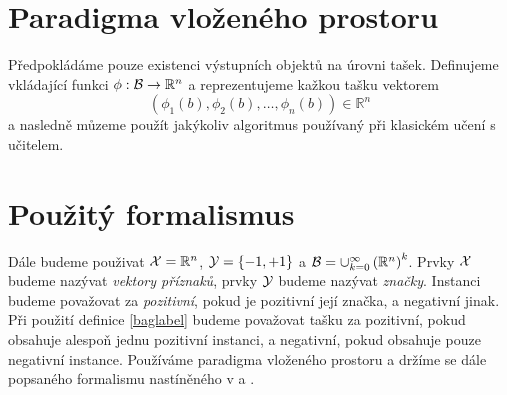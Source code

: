 \section{Paradigma vloženého prostoru}
Předpokládáme pouze existenci výstupních objektů na úrovni tašek. Definujeme vkládající funkci \( \phi : \mathcal B \to \mathbb R^n \) a reprezentujeme kažkou tašku vektorem
\begin{equation}
	\left( \phi_1 \left( b \right), \phi_2 \left( b \right), \dots, \phi_n \left( b \right) \right) \in \mathbb R^n
\end{equation}
a nasledně můzeme použít jakýkoliv algoritmus používaný při klasickém učení s učitelem.

\section{Použitý formalismus}
Dále budeme použivat \( \mathcal X = \mathbb R^n \), \( \mathcal Y = \left\{ -1, +1 \right\} \) a \( \mathcal B = \cup_{k = 0}^{\infty} \left( \mathbb R^n \right) ^k \). Prvky \( \mathcal X \) budeme nazývat \textit{vektory příznaků}, prvky \( \mathcal Y \) budeme nazývat \textit{značky}. Instanci budeme považovat za \textit{pozitivní}, pokud je pozitivní její značka, a negativní jinak. Při použití definice \eqref{baglabel} budeme považovat tašku za pozitivní, pokud obsahuje alespoň jednu pozitivní instanci, a negativní, pokud obsahuje pouze negativní instance. Používáme paradigma vloženého prostoru a držíme se dále popsaného formalismu nastíněného v \cite{pevny_using_2016} a \cite{pevny_discriminative_2016}.



